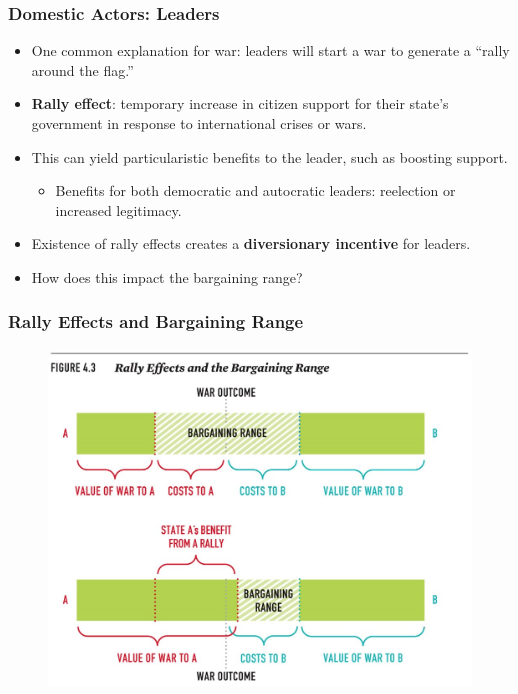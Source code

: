 \documentclass{beamer}
\begin{document}
\begin{frame} 
	\frametitle{\LARGE{Domestic Actors: Leaders}}
	\begin{itemize}
		\item One common explanation for war: leaders will start a war to generate a “rally around the flag.” \pause
		\item \textbf{Rally effect}: temporary increase in citizen support for their state's government in response to international crises or wars. \pause
		\item This can yield particularistic benefits to the leader, such as boosting support. \pause
		\begin{itemize}
			\item Benefits for both democratic and autocratic leaders: reelection or increased legitimacy.
		\end{itemize}
		\item Existence of rally effects creates a \textbf{diversionary incentive} for leaders. 
		\item How does this impact the bargaining range?
	\end{itemize}
\end{frame}

\begin{frame} 
	\frametitle{\LARGE{Rally Effects and Bargaining Range}}
	\begin{figure}[ht!]
		\centering
		\includegraphics[width=\textwidth,height=0.9\textheight,keepaspectratio]{Rallyeffectsbarg.jpg}
	\end{figure}
\end{frame}
\end{document}
